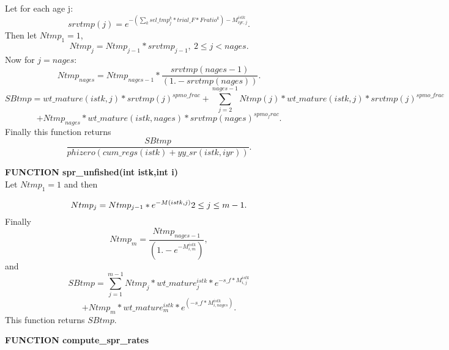 \documentclass{article}
\begin{document}
Let for each age j:
\begin{equation}
    srvtmp(j)=e^{-(\sum_{k}sel\_tmp^k_j*trial\_F*Fratio^k)-M^{istk}_{iyr,j}}.
\end{equation}
Then let $Ntmp_1=1$,
\begin{equation}
    Ntmp_j=Ntmp_{j-1}*srvtmp_{j-1}, \  2\leq j < nages.
\end{equation}
Now for $j=nages$:
\begin{equation}
Ntmp_{nages}=Ntmp_{nages-1}*\dfrac{srvtmp(nages-1)}{(1.-srvtmp(nages))}.
\end{equation}
\begin{equation}
    SBtmp=wt\_mature(istk,j)*srvtmp(j)^{spmo\_frac}+\sum_{ j=2}^{nages-1}Ntmp(j)*wt\_mature(istk,j)*srvtmp(j)^{spmo\_frac} 
\end{equation}
\begin{equation*}
+Ntmp_{nages}*wt\_mature(istk,nages)*srvtmp(nages)^{spmo_frac}.
\end{equation*}
Finally this function returns 
\begin{equation}
    \dfrac{SBtmp}{phizero(cum\_regs(istk)+yy\_sr(istk,iyr))}.
\end{equation}

\textbf{FUNCTION spr\_unfished(int istk,int i)}\\
Let $Ntmp_1=1$ and then 

\begin{equation*}
    Ntmp_j=Ntmp_{j-1}*e^{-M(istk,j)} \\ 2 \leq j \leq m-1.
\end{equation*}
Finally
\begin{equation}
    Ntmp_m=\dfrac{Ntmp_{nages-1}}{(1.-e^{-M^{istk}_{i,m}})},
\end{equation}
and
\begin{equation}
    SBtmp=\sum_{j=1}^{m-1}Ntmp_j*wt\_mature_j^{istk}*e^{-s\_f * M^{istk}_{i,j}}
\end{equation}
\begin{equation*}
+Ntmp_m*wt\_mature^{istk}_m*e^{(-s\_f * M^{istk}_{i,nages})}.
\end{equation*}
This function returns $SBtmp$.

\textbf{FUNCTION compute\_spr\_rates}\\
\end{document}
